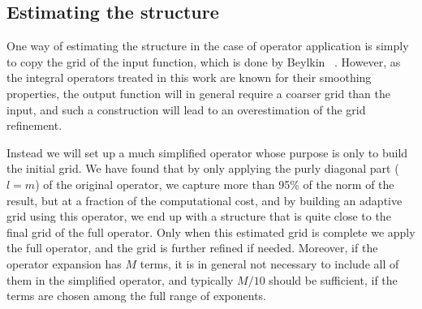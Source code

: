 \subsection{Estimating the \tree structure}
One way of estimating the \tree structure in the case of operator application 
is simply to copy the grid of the input function, which is done by Beylkin 
\etal~\cite{Beylkin:2008p37}. However, as the integral
operators treated in this work are known for their smoothing properties, the
output function will in general require a coarser grid than the input, and such
a construction will lead to an overestimation of the grid refinement. 

Instead we 
will set up a much simplified operator whose purpose is only to build the initial 
grid. We have found that by only applying the purly diagonal part ($l = m$) 
of the original operator, we capture more than 95\% of the norm of the result, 
but at a fraction of the computational cost, and by building an adaptive grid using
this operator, we end up with a \tree structure that is quite close to the final 
grid of the full operator. Only when this estimated grid is complete we apply the
full operator, and the grid is further refined if needed. Moreover, if the operator
expansion has $M$ terms, it is in general not necessary to include all of
them in the simplified operator, and typically $M/10$ should be sufficient,
if the terms are chosen among the full range of exponents.
